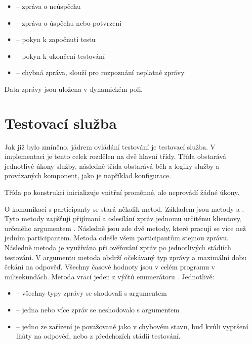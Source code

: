 \begin{itemize} 
    \item {} -- zpráva o neúspěchu
    \item {} -- zpráva o úspěchu nebo potvrzení
    \item {} -- pokyn k započnutí testu
    \item {} -- pokyn k ukončení testování
    \item {} -- chybná zpráva, slouží pro rozpoznání neplatné zprávy
\end{itemize}

Data zprávy jsou uložena v dynamickém poli. 


\section{Testovací služba}
Jak již bylo zmíněno, jádrem ovládání testování je testovací služba. V implementaci je tento celek rozdělen na dvě hlavní třídy. Třída  obstarává jednotlivé úkony služby, následně třída  obstarává běh a logiky služby a provázaných komponent, jako je například konfigurace. 

Třída  po konstrukci inicializuje vnitřní proměnné, ale neprovádí žádné úkony. 

O komunikaci s participanty se stará několik metod. Základem jsou metody  a . Tyto metody zajišťují přijímaní a odesílání zpráv jednomu určitému klientovy, určeného argumentem . Následně jsou zde dvě metody, které pracují se více než jedním participantem. Metoda  odešle všem participantům stejnou zprávu. Následně metoda  je využívána při ověřování zpráv po jednotlivých stádiích testování. V argumentu metoda obdrží očekávaný typ zprávy a maximální dobu čekání na odpověď. Všechny časové hodnoty jsou v celém programu v milisekundách. Metoda vrací jeden z výčtů enumerátoru . Jednotlivě:

\begin{itemize}
    \item {} -- všechny typy zprávy se shodovali s argumentem 
    \item {}  -- jedna nebo více zpráv se neshodovalo s argumentem 
    \item {} -- jedno ze zařízení je považované jako v chybovém stavu, buď kvůli vypršení lhůty na odpověď, nebo z předchozích stádií testování.   
\end{itemize}

